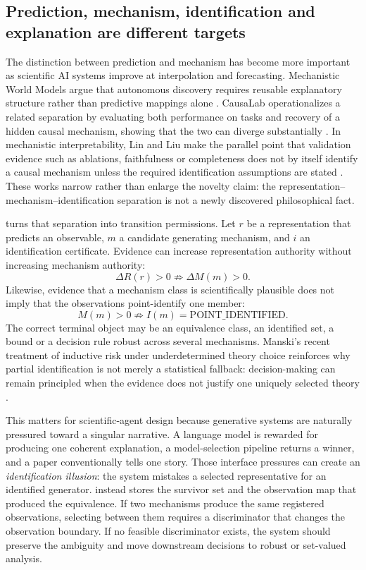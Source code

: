 \subsection{Prediction, mechanism, identification and explanation are different targets}

The distinction between prediction and mechanism has become more important as scientific AI systems improve at interpolation and forecasting. Mechanistic World Models argue that autonomous discovery requires reusable explanatory structure rather than predictive mappings alone \cite{posner2026mwm}. CausaLab operationalizes a related separation by evaluating both performance on tasks and recovery of a hidden causal mechanism, showing that the two can diverge substantially \cite{yang2026causalab}. In mechanistic interpretability, Lin and Liu make the parallel point that validation evidence such as ablations, faithfulness or completeness does not by itself identify a causal mechanism unless the required identification assumptions are stated \cite{linliu2026identification}. These works narrow rather than enlarge the \RAKL{} novelty claim: the representation--mechanism--identification separation is not a newly discovered philosophical fact.

\RAKL{} turns that separation into transition permissions. Let \(r\) be a representation that predicts an observable, \(m\) a candidate generating mechanism, and \(i\) an identification certificate. Evidence can increase representation authority without increasing mechanism authority:
\[
\Delta R(r)>0 \not\Rightarrow \Delta M(m)>0.
\]
Likewise, evidence that a mechanism class is scientifically plausible does not imply that the observations point-identify one member:
\[
M(m)>0 \not\Rightarrow I(m)=\text{POINT\_IDENTIFIED}.
\]
The correct terminal object may be an equivalence class, an identified set, a bound or a decision rule robust across several mechanisms. Manski's recent treatment of inductive risk under underdetermined theory choice reinforces why partial identification is not merely a statistical fallback: decision-making can remain principled when the evidence does not justify one uniquely selected theory \cite{manski2026underdetermination}.

This matters for scientific-agent design because generative systems are naturally pressured toward a singular narrative. A language model is rewarded for producing one coherent explanation, a model-selection pipeline returns a winner, and a paper conventionally tells one story. Those interface pressures can create an \emph{identification illusion}: the system mistakes a selected representative for an identified generator. \RAKL{} instead stores the survivor set and the observation map that produced the equivalence. If two mechanisms produce the same registered observations, selecting between them requires a discriminator that changes the observation boundary. If no feasible discriminator exists, the system should preserve the ambiguity and move downstream decisions to robust or set-valued analysis.

